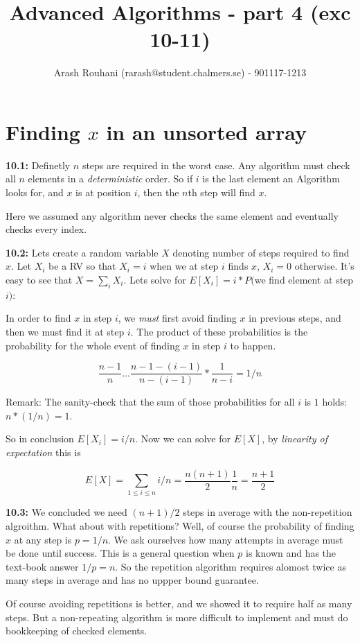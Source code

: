 \documentclass[a4paper,11pt]{article}
\title{Advanced Algorithms - part 4 (exc 10-11)}
\author{Arash Rouhani (rarash@student.chalmers.se) - 901117-1213}
\begin{document}
\maketitle

\section{Finding $x$ in an unsorted array}

\textbf{10.1:} Definetly $n$ steps are required in the worst case.
Any algorithm must check all $n$ elements in a \emph{deterministic} order.
So if $i$ is the last element an Algorithm looks for, and $x$ is at position
$i$, then the $n$th step will find $x$.

Here we assumed any algorithm never checks the same element and eventually
checks every index.

\textbf{10.2:} Lets create a random variable $X$ denoting number of steps
required to find $x$. Let $X_i$ be a RV so that $X_i = i$
when we at step $i$ finds $x$, $X_i = 0$ otherwise.
It's easy to see that $X = \sum_i X_i$.
Lets solve for $E[X_i]=i*P($we find element at step $i)$:

In order to find $x$ in step $i$, we \emph{must} first avoid finding
$x$ in previous steps, and then we must find it at step $i$.
The product of these probabilities is the probability for the whole
event of finding $x$ in step $i$ to happen.

\[
\frac{n-1}{n}\dots\frac{n-1-(i-1)}{n-(i-1)}*\frac{1}{n-i} = 1/n
\]

Remark: The sanity-check that the sum of those probabilities
for all $i$ is $1$ holds: $n*(1/n) = 1$.

So in conclusion $E[X_i]= i/n$. Now we can solve for $E[X]$,
by \emph{linearity of expectation} this is

\[
E[X] = \sum_{1 \leq i \leq n} i/n
     = \frac{n(n+1)}{2}\frac{1}{n}
     = \frac{n+1}{2}
\]

\textbf{10.3:} We concluded we need $(n+1)/2$ steps in average with the
non-repetition algroithm. What about with repetitions?
Well, of course the probability of finding $x$ at any step is
$p = 1/n$. We ask ourselves how many attempts in average must
be done until success. This is a general question when $p$ is known
and has the
text-book answer $1/p = n$. So the repetition algorithm
requires alomost twice as many steps in average and has no
uppper bound guarantee.

Of course avoiding repetitions is better, and we showed
it to require half as many steps. But a non-repeating
algorithm is more difficult to implement and must do bookkeeping
of checked elements.
\end{document}
